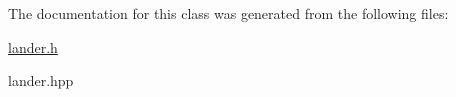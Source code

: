 The documentation for this class was generated from the following files\+:\begin{DoxyCompactItemize}
\item 
\hyperlink{lander_8h}{lander.\+h}\item 
lander.\+hpp\end{DoxyCompactItemize}
